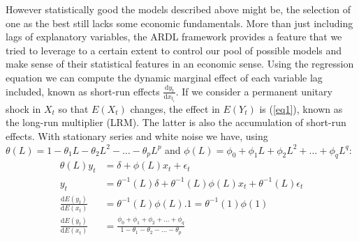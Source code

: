 However statistically good the models described above might be, the selection of one as the best still lacks some economic fundamentals. 
More than just including lags of explanatory variables, the ARDL framework provides a feature that we tried to leverage to a certain extent to control our pool of possible models and make sense of their statistical features in an economic sense. 
Using the regression equation we can compute the dynamic marginal effect of each variable lag included, known as short-run effects $\frac{\mathrm{d}y_{t}}{\mathrm{d}x_{t_{i}}}$. 
If we consider a permanent unitary shock in $X_{t}$ so that $E(X_{t})$ changes, the effect in $E(Y_{t})$ is (\ref{eq1}), known as the long-run multiplier (LRM). The latter is also the accumulation of short-run effects. 
With stationary series and white noise we have, using $\theta (L) = 1 - \theta_{1}L - \theta_{2}L^{2} - \dots - \theta_{p}L^{p}$ and $\phi (L) = \phi_{0} + \phi_{1}L + \phi_{2}L^{2} + \dots + \phi_{q}L^{q}$:
\vspace{-0.3cm}
\begin{align}
    \theta (L)y_{t} &= \delta + \phi (L)x_{t} + \epsilon_{t} \nonumber \\
    y_{t} &= \theta^{-1} (L)\delta + \theta^{-1} (L)\phi (L)x_{t} + \theta^{-1} (L)\epsilon_{t} \nonumber \\
    \frac{\mathrm{d}E(y_{t})}{\mathrm{d}E(x_{t})} &= \theta^{-1} (L)\phi (L).1 = \theta^{-1} (1)\phi (1) \nonumber\\
    \frac{\mathrm{d}E(y_{t})}{\mathrm{d}E(x_{t})} &= \frac{\phi_{0} + \phi_{1} + \phi_{2} + \dots + \phi_{q}}{1 - \theta_{1} - \theta_{2} - \dots - \theta_{p}} \label{eq1}
\end{align}

